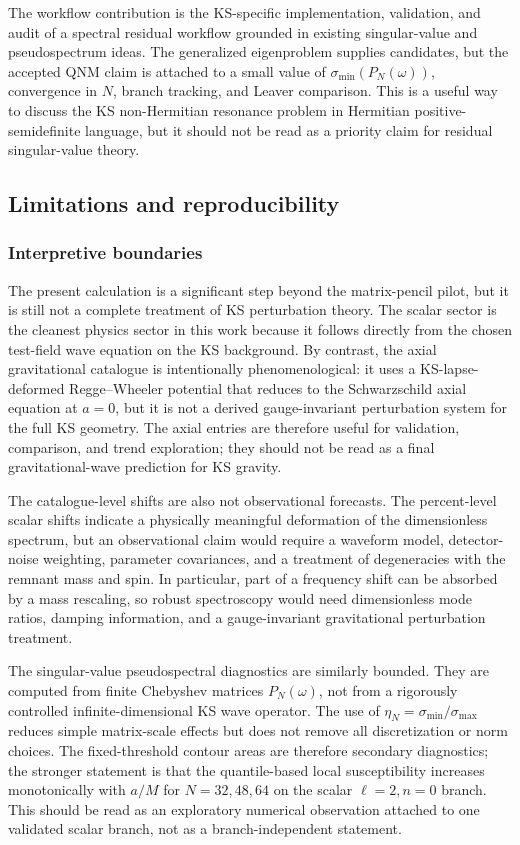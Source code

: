 ﻿\documentclass[12pt,a4paper]{article}
\begin{document}
The workflow contribution is the KS-specific implementation, validation, and audit of a spectral residual workflow grounded in existing singular-value and pseudospectrum ideas. The generalized eigenproblem supplies candidates, but the accepted QNM claim is attached to a small value of \(\sigma_{\min}(P_N(\omega))\), convergence in \(N\), branch tracking, and Leaver comparison. This is a useful way to discuss the KS non-Hermitian resonance problem in Hermitian positive-semidefinite language, but it should not be read as a priority claim for residual singular-value theory.

\subsection{Limitations and reproducibility}

\subsubsection{Interpretive boundaries}

The present calculation is a significant step beyond the matrix-pencil pilot, but it is still not a complete treatment of KS perturbation theory. The scalar sector is the cleanest physics sector in this work because it follows directly from the chosen test-field wave equation on the KS background. By contrast, the axial gravitational catalogue is intentionally phenomenological: it uses a KS-lapse-deformed Regge--Wheeler potential that reduces to the Schwarzschild axial equation at \(a=0\), but it is not a derived gauge-invariant perturbation system for the full KS geometry. The axial entries are therefore useful for validation, comparison, and trend exploration; they should not be read as a final gravitational-wave prediction for KS gravity.

The catalogue-level shifts are also not observational forecasts. The percent-level scalar shifts indicate a physically meaningful deformation of the dimensionless spectrum, but an observational claim would require a waveform model, detector-noise weighting, parameter covariances, and a treatment of degeneracies with the remnant mass and spin. In particular, part of a frequency shift can be absorbed by a mass rescaling, so robust spectroscopy would need dimensionless mode ratios, damping information, and a gauge-invariant gravitational perturbation treatment.

The singular-value pseudospectral diagnostics are similarly bounded. They are computed from finite Chebyshev matrices \(P_N(\omega)\), not from a rigorously controlled infinite-dimensional KS wave operator. The use of \(\eta_N=\sigma_{\min}/\sigma_{\max}\) reduces simple matrix-scale effects but does not remove all discretization or norm choices. The fixed-threshold contour areas are therefore secondary diagnostics; the stronger statement is that the quantile-based local susceptibility increases monotonically with \(a/M\) for \(N=32,48,64\) on the scalar \(\ell=2,n=0\) branch. This should be read as an exploratory numerical observation attached to one validated scalar branch, not as a branch-independent statement.
\end{document}
